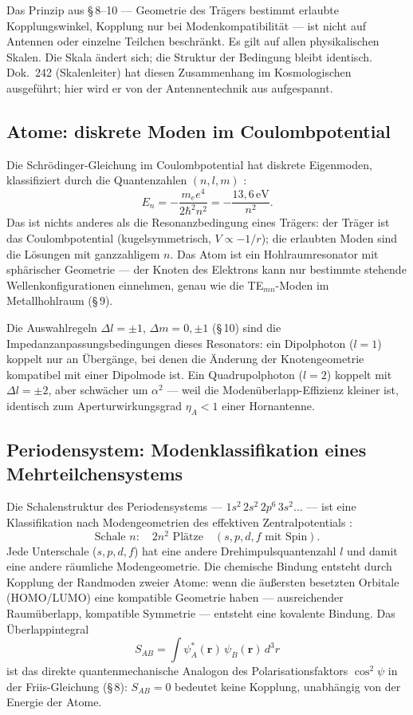 Das Prinzip aus §\,8--10 --- Geometrie des Trägers bestimmt erlaubte
Kopplungswinkel, Kopplung nur bei Modenkompatibilität --- ist nicht auf
Antennen oder einzelne Teilchen beschränkt. Es gilt auf allen physikalischen
Skalen. Die Skala ändert sich; die Struktur der Bedingung bleibt identisch.
Dok.~242 (Skalenleiter) hat diesen Zusammenhang im Kosmologischen ausgeführt;
hier wird er von der Antennentechnik aus aufgespannt.

\subsection*{Atome: diskrete Moden im Coulombpotential}

Die Schrödinger-Gleichung im Coulombpotential hat diskrete Eigenmoden,
klassifiziert durch die Quantenzahlen $(n, l, m)$ \cite{Griffiths1995,CohenTannoudji1977}:
\[
  E_n = -\frac{m_e e^4}{2\hbar^2 n^2} = -\frac{13{,}6\,\mathrm{eV}}{n^2}.
\]
Das ist nichts anderes als die Resonanzbedingung eines Trägers: der
Träger ist das Coulombpotential (kugelsymmetrisch, $V\propto -1/r$);
die erlaubten Moden sind die Lösungen mit ganzzahligem $n$. Das Atom
ist ein Hohlraumresonator mit sphärischer Geometrie --- der Knoten
des Elektrons kann nur bestimmte stehende Wellenkonfigurationen
einnehmen, genau wie die TE$_{mn}$-Moden im Metallhohlraum (§\,9).

Die Auswahlregeln $\Delta l = \pm 1$, $\Delta m = 0,\pm 1$ (§\,10)
sind die Impedanzanpassungsbedingungen dieses Resonators: ein
Dipolphoton ($l=1$) koppelt nur an Übergänge, bei denen die
Änderung der Knotengeometrie kompatibel mit einer Dipolmode ist.
Ein Quadrupolphoton ($l=2$) koppelt mit $\Delta l = \pm 2$, aber
schwächer um $\alpha^2$ --- weil die Modenüberlapp-Effizienz kleiner
ist, identisch zum Aperturwirkungsgrad $\eta_A < 1$ einer Hornantenne.

\subsection*{Periodensystem: Modenklassifikation eines Mehrteilchensystems}

Die Schalenstruktur des Periodensystems --- $1s^2\,2s^2\,2p^6\,3s^2\ldots$
--- ist eine Klassifikation nach Modengeometrien des effektiven
Zentralpotentials \EM:
\[
  \text{Schale } n: \quad 2n^2 \text{ Plätze}
  \quad (s, p, d, f \text{ mit Spin}).
\]
Jede Unterschale ($s, p, d, f$) hat eine andere Drehimpulsquantenzahl
$l$ und damit eine andere räumliche Modengeometrie. Die chemische
Bindung entsteht durch Kopplung der Randmoden zweier Atome: wenn die
äußersten besetzten Orbitale (HOMO/LUMO) eine kompatible Geometrie
haben --- ausreichender Raumüberlapp, kompatible Symmetrie --- entsteht
eine kovalente Bindung. Das Überlappintegral
\[
  S_{AB} = \int \psi_A^*(\mathbf{r})\,\psi_B(\mathbf{r})\,d^3r
\]
ist das direkte quantenmechanische Analogon des Polarisationsfaktors
$\cos^2\psi$ in der Friis-Gleichung (§\,8): $S_{AB}=0$ bedeutet
keine Kopplung, unabhängig von der Energie der Atome.

